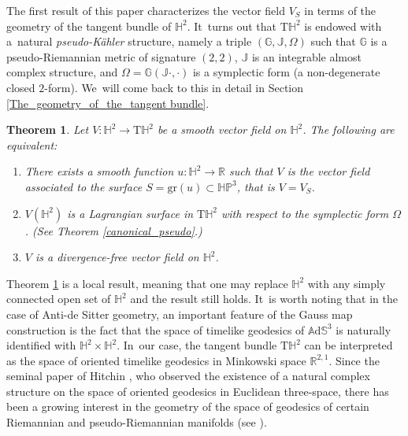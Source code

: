\documentclass[11pt]{article}
\theoremstyle{plain}
\newtheorem{theorem}[cor]{Theorem}
\theoremstyle{definition}
\newcommand{\ads}{\mathbb{A}\mathrm{d}\mathbb{S}^3}
\newcommand{\HP}{\mathbb{HP}^3}
\begin{document}
The first result of this paper characterizes the vector field \(V_S\) in terms of the geometry of the tangent bundle of \(\mathbb{H}^2\). It~turns out that \(\mathrm{T}\mathbb{H}^2\) is endowed with a~natural \emph{pseudo-Kähler} structure, namely a triple \((\mathbb{G}, \mathbb{J}, \Omega)\) such that \(\mathbb{G}\) is a pseudo-Riemannian metric of signature \((2,2)\), \(\mathbb{J}\) is an integrable almost complex structure, and \(\Omega = \mathbb{G}(\mathbb{J} \cdot, \cdot)\) is a symplectic form (a non-degenerate closed $2$-form). We~will come back to this in detail in Section \ref{The_geometry_of_the_tangent bundle}.
\begin{theorem}\label{intro_divergence}
Let \(V: \mathbb{H}^2 \to \mathrm{T}\mathbb{H}^2\) be a smooth vector field on \(\mathbb{H}^2\). The following are equivalent:
\begin{enumerate}
\item There exists a smooth function \(u: \mathbb{H}^2 \to \mathbb{R}\) such that \(V\) is the vector field associated to the surface \(S = \mathrm{gr}(u) \subset \HP\), that is \(V = V_S\).
\item \(V(\mathbb{H}^2)\) is a \emph{Lagrangian} surface in \(\mathrm{T}\mathbb{H}^2\) with respect to the symplectic form \(\Omega\). (See Theorem \ref{canonical_pseudo}.)
\item \(V\) is a divergence-free vector field on \(\mathbb{H}^2\).
\end{enumerate}
\end{theorem}

Theorem \ref{intro_divergence} is a local result, meaning that one may replace $\mathbb{H}^2$ with any simply connected open set of $\mathbb{H}^2$ and the result still holds. It~is worth noting that in the case of Anti-de Sitter geometry, an important feature of the Gauss map construction is the fact that the space of timelike geodesics of \(\ads\) is naturally identified with \(\mathbb{H}^2 \times \mathbb{H}^2\). In~our case, the tangent bundle \(\mathrm{T}\mathbb{H}^2\) can be interpreted as the space of oriented timelike geodesics in Minkowski space \(\mathbb{R}^{2,1}\). Since the seminal paper of Hitchin \cite{Monopole_Hitchin}, who observed the existence of a natural complex structure on the space of oriented geodesics in Euclidean three-space, there has been a growing interest in the geometry of the space of geodesics of certain Riemannian and pseudo-Riemannian manifolds (see \cite{An_indi_Kaehler,Anciaux_space_of_geodesic,Salvai_Godoy_smooth_foliation,ML_in_tangent_bundle,Bon_Emam,Emam_Seppi1}).
\end{document}
